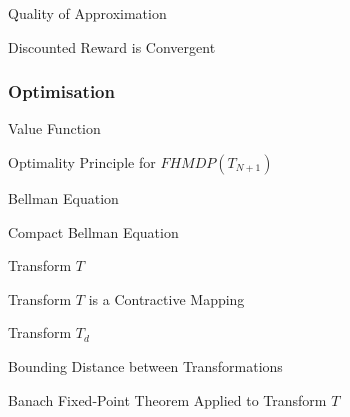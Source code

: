 \documentclass[11pt,a4paper]{article}
\begin{document}
  \begin{remark}{Quality of Approximation}

  \end{remark}

  \begin{remark}{Discounted Reward is Convergent}

  \end{remark}

\subsubsection{Optimisation} %

  \begin{definition}{Value Function}
  \end{definition}

  \begin{theorem}{Optimality Principle for $FHMDP(T_{N+1})$}

  \end{theorem}

  \begin{definition}{Bellman Equation}

  \end{definition}

  \begin{remark}{Compact Bellman Equation}

  \end{remark}

  \begin{definition}{Transform $T$}

  \end{definition}

  \begin{theorem}{Transform $T$ is a Contractive Mapping}

  \end{theorem}

  \begin{definition}{Transform $T_d$}

  \end{definition}

  \begin{theorem}{Bounding Distance between Transformations}

  \end{theorem}

  \begin{theorem}{Banach Fixed-Point Theorem Applied to Transform $T$}

  \end{theorem}
\end{document}
